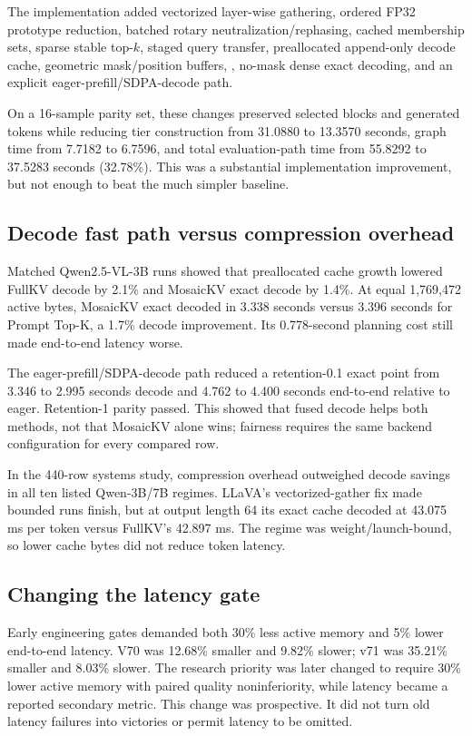 \documentclass[11pt]{article}
\newcommand{\code}[1]{\texttt{\detokenize{#1}}}
\begin{document}
The implementation added vectorized layer-wise gathering, ordered FP32 prototype reduction,
batched rotary neutralization/rephasing, cached membership sets, sparse stable top-$k$, staged
query transfer, preallocated append-only decode cache, geometric mask/position buffers,
\code{logits_to_keep=1}, no-mask dense exact decoding, and an explicit eager-prefill/SDPA-decode
path.

On a 16-sample parity set, these changes preserved selected blocks and generated tokens while
reducing tier construction from 31.0880 to 13.3570 seconds, graph time from 7.7182 to 6.7596, and
total evaluation-path time from 55.8292 to 37.5283 seconds (32.78\%).  This was a substantial
implementation improvement, but not enough to beat the much simpler baseline.

\subsection{Decode fast path versus compression overhead}

Matched Qwen2.5-VL-3B runs showed that preallocated cache growth lowered FullKV decode by 2.1\% and
MosaicKV exact decode by 1.4\%.  At equal 1,769,472 active bytes, MosaicKV exact decoded in 3.338
seconds versus 3.396 seconds for Prompt Top-K, a 1.7\% decode improvement.  Its 0.778-second
planning cost still made end-to-end latency worse.

The eager-prefill/SDPA-decode path reduced a retention-0.1 exact point from 3.346 to 2.995 seconds
decode and 4.762 to 4.400 seconds end-to-end relative to eager.  Retention-1 parity passed.  This
showed that fused decode helps both methods, not that MosaicKV alone wins; fairness requires the
same backend configuration for every compared row.

In the 440-row systems study, compression overhead outweighed decode savings in all ten listed
Qwen-3B/7B regimes.  LLaVA's vectorized-gather fix made bounded runs finish, but at output length 64
its exact cache decoded at 43.075 ms per token versus FullKV's 42.897 ms.  The regime was
weight/launch-bound, so lower cache bytes did not reduce token latency.

\subsection{Changing the latency gate}

Early engineering gates demanded both 30\% less active memory and 5\% lower end-to-end latency.
V70 was 12.68\% smaller and 9.82\% slower; v71 was 35.21\% smaller and 8.03\% slower.  The research
priority was later changed to require 30\% lower active memory with paired quality noninferiority,
while latency became a reported secondary metric.  This change was prospective.  It did not turn
old latency failures into victories or permit latency to be omitted.
\end{document}
